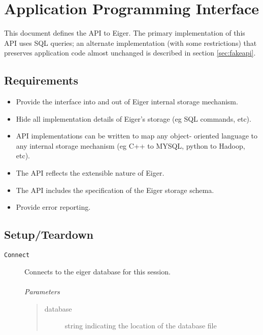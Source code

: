 \section{Application Programming Interface}
\label{sec:api}
This document defines the API to Eiger. The primary implementation of this API uses SQL queries; an alternate implementation (with some restrictions) that preserves application code almost unchanged is described in section \ref{sec:fakeapi}.

\subsection{Requirements}

\begin{itemize}
\item Provide the interface into and out of Eiger internal 
  storage mechanism.

\item Hide all implementation details of Eiger's storage (eg
  SQL commands, etc).

\item API implementations can be written to map any object-
  oriented language to any internal storage mechanism (eg 
  C++ to MYSQL, python to Hadoop, etc).
 
\item The API reflects the extensible nature of Eiger.

\item The API includes the specification of the Eiger storage
  schema.

\item Provide error reporting.
\end{itemize}

\subsection{Setup/Teardown}
\begin{description}
\item[\texttt{Connect}]
	Connects to the eiger database for this session.\\ \\
	{\em Parameters}
	\begin{quote}
	\begin{description}
    \item[database] string indicating the location of the database file
	\end{description}
	\end{quote}
\end{description}

